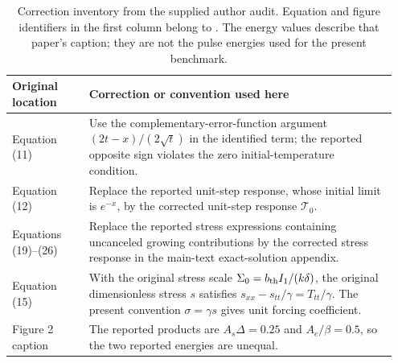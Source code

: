 \documentclass[11pt]{article}
\begin{document}
\begin{table}[htbp]
\centering
\caption{Correction inventory from the supplied author audit. Equation and
figure identifiers in the first column belong to \citet{AlQahtani2026}.
The energy values describe that paper's caption; they are not the pulse
energies used for the present benchmark.}
\label{tab:supp-corrections}
\begin{tabular}{@{}p{0.19\linewidth}p{0.76\linewidth}@{}}
\toprule
Original location & Correction or convention used here\\
\midrule
Equation (11) & Use the complementary-error-function argument
$(2t-x)/(2\sqrt t)$ in the identified term; the reported opposite sign
violates the zero initial-temperature condition.\\
Equation (12) & Replace the reported unit-step response, whose initial
limit is $e^{-x}$, by the corrected unit-step response $\mathcal T_0$.\\
Equations (19)--(26) & Replace the reported stress expressions containing
uncanceled growing contributions by the corrected stress response in the
main-text exact-solution appendix.\\
Equation (15) & With the original stress scale $\Sigma_0=b_{\rm th}I_1/(k\delta)$,
the original dimensionless stress $s$ satisfies
$s_{xx}-s_{tt}/\gamma=T_{tt}/\gamma$.
The present convention $\sigma=\gamma s$ gives unit forcing coefficient.\\
Figure 2 caption & The reported products are $A_s\Delta=0.25$ and
$A_e/\beta=0.5$, so the two reported energies are unequal.\\
\bottomrule
\end{tabular}
\end{table}
\end{document}
